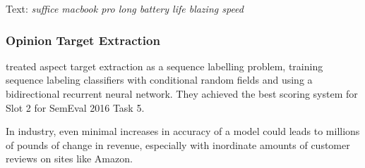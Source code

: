 \begin{center}
    Text: \textit{suffice macbook pro long battery life blazing speed}
\end{center}




\subsubsection{Opinion Target Extraction}
\textcolor{cite}{\citet{tohsu}} treated aspect target extraction as a sequence labelling problem, training sequence labeling classifiers with conditional random fields and using a bidirectional recurrent neural network. They achieved the best scoring system for Slot 2 for SemEval 2016 Task 5.  


In industry, even minimal increases in accuracy of a model could leads to millions of pounds of change in revenue, especially with inordinate amounts of customer reviews on sites like Amazon. 
